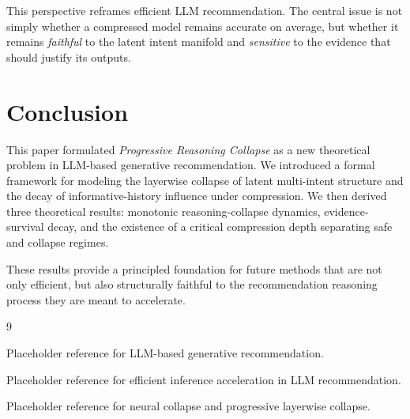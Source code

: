 \documentclass[11pt]{article}
\begin{document}
This perspective reframes efficient LLM recommendation. The central issue is not simply whether a compressed model remains accurate on average, but whether it remains \emph{faithful} to the latent intent manifold and \emph{sensitive} to the evidence that should justify its outputs.

\section{Conclusion}

This paper formulated \emph{Progressive Reasoning Collapse} as a new theoretical problem in LLM-based generative recommendation. We introduced a formal framework for modeling the layerwise collapse of latent multi-intent structure and the decay of informative-history influence under compression. We then derived three theoretical results: monotonic reasoning-collapse dynamics, evidence-survival decay, and the existence of a critical compression depth separating safe and collapse regimes.

These results provide a principled foundation for future methods that are not only efficient, but also structurally faithful to the recommendation reasoning process they are meant to accelerate.


\begin{thebibliography}{9}

Placeholder reference for LLM-based generative recommendation.

Placeholder reference for efficient inference acceleration in LLM recommendation.

Placeholder reference for neural collapse and progressive layerwise collapse.

\end{thebibliography}
\end{document}
